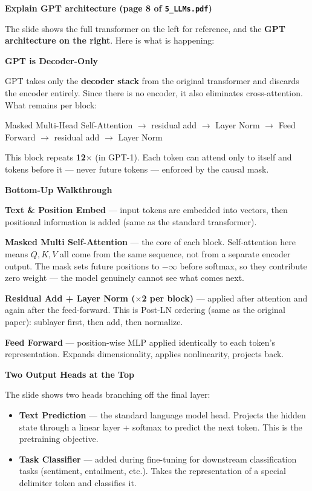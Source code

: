 \bigskip

\textbf{Explain GPT architecture (page 8 of \texttt{5\_LLMs.pdf})}

The slide shows the full transformer on the left for reference, and the \textbf{GPT architecture on the right}. Here is what is happening:

\medskip
\noindent\textbf{GPT is Decoder-Only}

GPT takes only the \textbf{decoder stack} from the original transformer and discards the encoder entirely. Since there is no encoder, it also eliminates cross-attention. What remains per block:

\medskip
\noindent Masked Multi-Head Self-Attention $\to$ residual add $\to$ Layer Norm $\to$ Feed Forward $\to$ residual add $\to$ Layer Norm

\medskip
\noindent This block repeats \textbf{12$\times$} (in GPT-1). Each token can attend only to itself and tokens before it --- never future tokens --- enforced by the causal mask.

\medskip
\noindent\textbf{Bottom-Up Walkthrough}

\noindent\textbf{Text \& Position Embed} --- input tokens are embedded into vectors, then positional information is added (same as the standard transformer).

\noindent\textbf{Masked Multi Self-Attention} --- the core of each block. Self-attention here means $Q, K, V$ all come from the same sequence, not from a separate encoder output. The mask sets future positions to $-\infty$ before softmax, so they contribute zero weight --- the model genuinely cannot see what comes next.

\noindent\textbf{Residual Add + Layer Norm ($\times$2 per block)} --- applied after attention and again after the feed-forward. This is Post-LN ordering (same as the original paper): sublayer first, then add, then normalize.

\noindent\textbf{Feed Forward} --- position-wise MLP applied identically to each token's representation. Expands dimensionality, applies nonlinearity, projects back.

\medskip
\noindent\textbf{Two Output Heads at the Top}

The slide shows two heads branching off the final layer:

\begin{itemize}
  \item \textbf{Text Prediction} --- the standard language model head. Projects the hidden state through a linear layer + softmax to predict the next token. This is the pretraining objective.
  \item \textbf{Task Classifier} --- added during fine-tuning for downstream classification tasks (sentiment, entailment, etc.). Takes the representation of a special delimiter token and classifies it.
\end{itemize}

